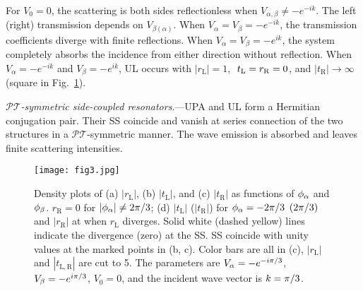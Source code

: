 \documentclass[prl,showpacs,superscriptaddress,twocolumn]{revtex4-1}
\begin{document}
For $V_{0}=0$, the scattering is both sides reflectionless when $V_{\alpha
,\beta }\neq -e^{-ik}$. The left (right) transmission depends on $V_{\beta
(\alpha )}$. When $V_{\alpha }=V_{\beta }=-e^{-ik}$, the transmission
coefficients diverge with finite reflections. When $V_{\alpha }=V_{\beta
}=-e^{ik}$, the system completely absorbs the incidence from either
direction without reflection. When $V_{\alpha }=-e^{-ik}$ and $V_{\beta
}=-e^{ik}$, UL occurs with $\left\vert r_{\mathrm{L}}\right\vert =1$, $\ t_{%
\mathrm{L}}=r_{\mathrm{R}}=0$, and $\left\vert t_{\mathrm{R}}\right\vert
\rightarrow \infty $ (square in Fig.~\ref{figPT}).

$\mathcal{PT}$\emph{-symmetric side-coupled resonators}.---UPA and UL form a
Hermitian conjugation pair. Their SS coincide and vanish at series
connection of the two structures in a $\mathcal{PT}$-symmetric manner. The
wave emission is absorbed and leaves finite scattering intensities.

\begin{figure}[t]
\centering\texttt{[image: fig3.jpg]}
\caption{Density plots of (a) $|r_{\mathrm{L}}|$, (b) $|t_{\mathrm{L}}|$, and
(c) $|t_{\mathrm{R}}|$ as functions of $\protect\phi _{\protect\alpha }$ and $\protect\phi _{\protect\beta }$. $r_{\mathrm{R}}=0$ for $\left\vert \protect\phi _{\protect\alpha }\right\vert \neq 2\protect\pi /3$; (d) $|t_{\mathrm{L}}|
$ ($|t_{\mathrm{R}}|$) for $\protect\phi _{\protect\alpha }=-2\protect\pi /3$ $(2\protect\pi /3)$ and $|r_{\mathrm{R}}|$ at when $r_{\mathrm{L}}$ diverges. Solid white (dashed yellow) lines indicate the divergence (zero) at the SS. SS coincide with unity values at the marked points in (b, c). Color bars are all in (c), $|r_{\mathrm{L}}|$ and $|t_{\mathrm{L,R}}|$ are cut to 5. The parameters are $V_{\protect\alpha }=-e^{-i\pi/3}$, $V_{\protect\beta }=-e^{i\pi/3}$,
$V_{0}=0$, and the
incident wave vector is $k=\protect\pi /3$.} \label{figPT}
\end{figure}
\end{document}
